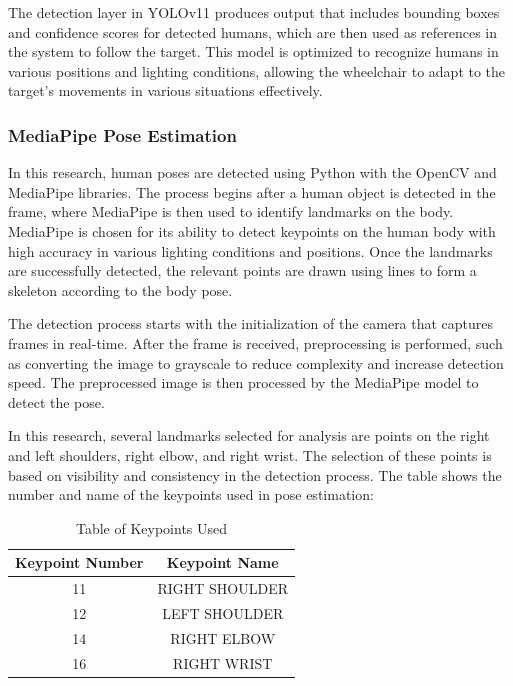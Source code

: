 The detection layer in YOLOv11 produces output that includes bounding boxes and confidence scores for detected humans, which are then used as references in the system to follow the target. This model is optimized to recognize humans in various positions and lighting conditions, allowing the wheelchair to adapt to the target's movements in various situations effectively.

\vspace{5pt}
\subsubsection{MediaPipe Pose Estimation}
\label{subsubsec:mediapipeposeestimation}

In this research, human poses are detected using Python with the OpenCV and MediaPipe libraries. The process begins after a human object is detected in the frame, where MediaPipe is then used to identify landmarks on the body. MediaPipe is chosen for its ability to detect keypoints on the human body with high accuracy in various lighting conditions and positions. Once the landmarks are successfully detected, the relevant points are drawn using lines to form a skeleton according to the body pose.

The detection process starts with the initialization of the camera that captures frames in real-time. After the frame is received, preprocessing is performed, such as converting the image to grayscale to reduce complexity and increase detection speed. The preprocessed image is then processed by the MediaPipe model to detect the pose.

In this research, several landmarks selected for analysis are points on the right and left shoulders, right elbow, and right wrist. The selection of these points is based on visibility and consistency in the detection process. The table shows the number and name of the keypoints used in pose estimation:

\begin{table}[H]
  \centering
  \caption{Table of Keypoints Used}
  \label{tab:keypoints}
  \begin{tabular}{|c|c|}
    \hline
    Keypoint Number & Keypoint Name \\
    \hline
    11 & RIGHT SHOULDER \\
    12 & LEFT SHOULDER \\
    14 & RIGHT ELBOW \\
    16 & RIGHT WRIST \\
    \hline
  \end{tabular}
\end{table}


